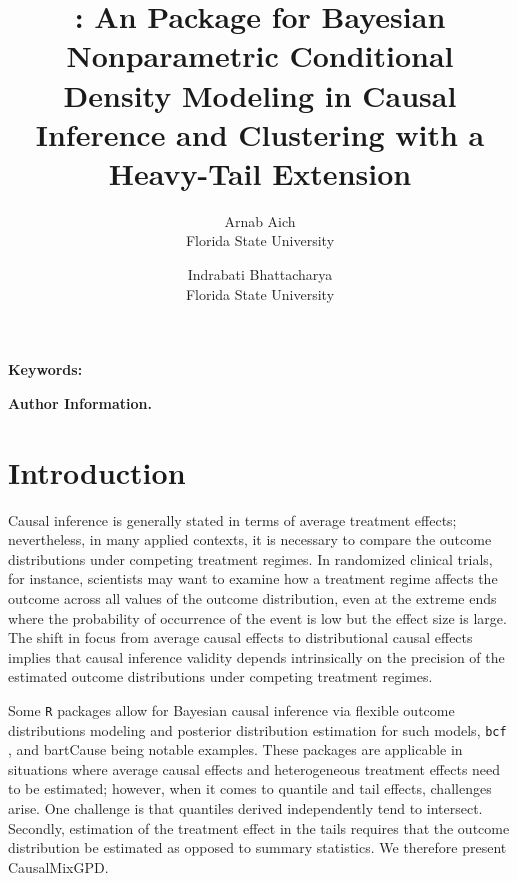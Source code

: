 \documentclass[11pt]{article}\usepackage[]{graphicx}\usepackage[]{xcolor}
\author{Arnab Aich\\Florida State University \and Indrabati Bhattacharya\\Florida State University}
\date{}
\title{\pkg{CausalMixGPD}: An \proglang{R} Package for Bayesian Nonparametric Conditional Density Modeling in Causal Inference and Clustering with a Heavy-Tail Extension}
\newcommand{\pkg}[1]{\textsf{#1}}
\newcommand{\proglang}[1]{\texttt{#1}}
\newcommand{\cmgpdAbstract}{}
\newcommand{\cmgpdKeywords}{}
\newcommand{\cmgpdAddress}{}
\begin{document}
\maketitle
\begin{abstract}
\cmgpdAbstract
\end{abstract}
\noindent\textbf{Keywords:} \cmgpdKeywords

\medskip
\noindent\textbf{Author Information.}
\par \cmgpdAddress



\section{Introduction}

Causal inference is generally stated in terms of average treatment
effects; nevertheless, in many applied contexts, it is necessary to
compare the outcome distributions under competing treatment regimes.
In randomized clinical trials, for instance, scientists may want to
examine how a treatment regime affects the outcome across all values
of the outcome distribution, even at the extreme ends where the
probability of occurrence of the event is low but the effect size is
large. The shift in focus from average causal effects to
distributional causal effects implies that causal inference validity
depends intrinsically on the precision of the estimated outcome
distributions under competing treatment regimes.

Some \proglang{R} packages allow for Bayesian causal inference via
flexible outcome distributions modeling and posterior distribution
estimation for such models,
\proglang{bcf} \citep{bcf_method,bcf_pkg}, and \pkg{bartCause}
\citep{bartCause_method,bartCause_pkg} being notable examples. These packages are
applicable in situations where average causal effects and
heterogeneous treatment effects need to be estimated; however, when it
comes to quantile and tail effects, challenges arise. One challenge
is that quantiles derived independently tend to intersect. Secondly,
estimation of the treatment effect in the tails requires that the
outcome distribution be estimated as opposed to summary statistics.
We therefore present \pkg{CausalMixGPD}.
\end{document}
